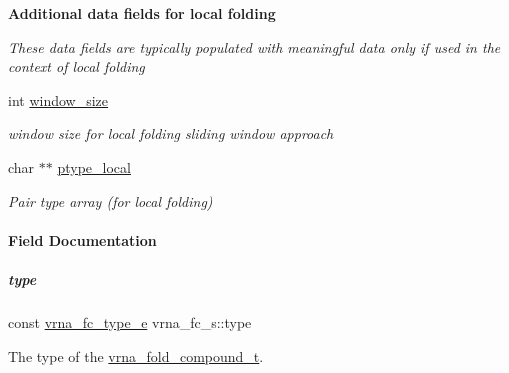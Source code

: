 \begin{Indent}\textbf{ Additional data fields for local folding}\par
{\em These data fields are typically populated with meaningful data only if used in the context of local folding }\begin{DoxyCompactItemize}
\item 
\mbox{\label{group__fold__compound_adacbf7cdfb47d3072683ab509de735f6}} 
int \hyperlink{group__fold__compound_adacbf7cdfb47d3072683ab509de735f6}{window\+\_\+size}
\begin{DoxyCompactList}\small\item\em window size for local folding sliding window approach \end{DoxyCompactList}\item 
\mbox{\label{group__fold__compound_a2ecb8ff5e21190936a8a146be7a251ff}} 
char $\ast$$\ast$ \hyperlink{group__fold__compound_a2ecb8ff5e21190936a8a146be7a251ff}{ptype\+\_\+local}
\begin{DoxyCompactList}\small\item\em Pair type array (for local folding) \end{DoxyCompactList}\end{DoxyCompactItemize}
\end{Indent}


\paragraph{Field Documentation}
\mbox{\label{group__fold__compound_a391bcf8ac5997784aaf780cdd251c464}} 
\subparagraph{\texorpdfstring{type}{type}}
{\footnotesize\ttfamily const \hyperlink{group__fold__compound_ga01a4ff86fa71deaaa5d1abbd95a1447d}{vrna\+\_\+fc\+\_\+type\+\_\+e} vrna\+\_\+fc\+\_\+s\+::type}



The type of the \hyperlink{group__fold__compound_ga1b0cef17fd40466cef5968eaeeff6166}{vrna\+\_\+fold\+\_\+compound\+\_\+t}. 

